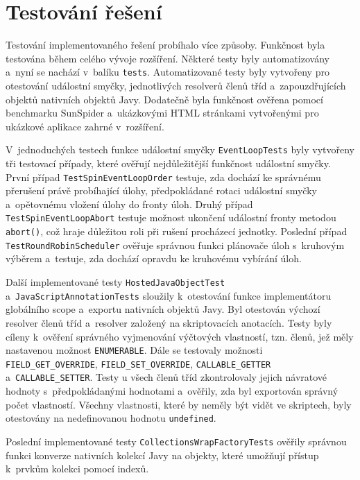 \section{Testování řešení}
\label{Chapter.Testing}

Testování implementovaného řešení probíhalo více způsoby. Funkčnost byla testována během celého vývoje rozšíření. Některé testy byly automatizovány a~nyní se nachází v~balíku \texttt{tests}. Automatizované testy byly vytvořeny pro otestování událostní smyčky, jednotlivých resolverů členů tříd a~zapouzdřujících objektů nativních objektů Javy. Dodatečně byla funkčnost ověřena pomocí benchmarku SunSpider a~ukázkovými HTML stránkami vytvořenými pro ukázkové aplikace zahrné v~rozšíření.

V~jednoduchých testech funkce událostní smyčky \texttt{EventLoopTests} byly vytvořeny tři testovací případy, které ověřují nejdůležitější funkčnost událostní smyčky. První případ \texttt{TestSpinEventLoopOrder} testuje, zda dochází ke správnému přerušení právě probíhající úlohy, předpokládané rotaci událostní smyčky a~opětovnému vložení úlohy do fronty úloh. Druhý případ \texttt{TestSpinEventLoopAbort} testuje možnost ukončení událostní fronty metodou \texttt{abort()}, což hraje důležitou roli při rušení procházecí jednotky. Poslední případ \texttt{TestRoundRobinScheduler} ověřuje správnou funkci plánovače úloh s~kruhovým výběrem a~testuje, zda dochází opravdu ke kruhovému vybírání úloh.

Další implementované testy \texttt{HostedJavaObjectTest} a~\texttt{JavaScriptAnnotationTests} sloužily k~otestování funkce implementátoru globálního scope  a~exportu nativních objektů Javy. Byl otestován výchozí resolver členů tříd a~resolver založený na skriptovacích anotacích. Testy byly cíleny k~ověření správného vyjmenování výčtových vlastností, tzn. členů, jež měly nastavenou možnost \texttt{ENUMERABLE}. Dále se testovaly možnosti \texttt{FIELD\_GET\_OVERRIDE}, \texttt{FIELD\_SET\_OVERRIDE}, \texttt{CALLABLE\_GETTER} a~\texttt{CALLABLE\_SETTER}. Testy u všech členů tříd zkontrolovaly jejich návratové hodnoty s~předpokládanými hodnotami a~ověřily, zda byl exportován správný počet vlastností. Všechny vlastnosti, které by neměly být vidět ve skriptech, byly otestovány na nedefinovanou hodnotu \texttt{undefined}.

\newpage

Poslední implementované testy \texttt{CollectionsWrapFactoryTests} ověřily správnou funkci konverze nativních kolekcí Javy na objekty, které umožňují přístup k~prvkům kolekci pomocí indexů. 

